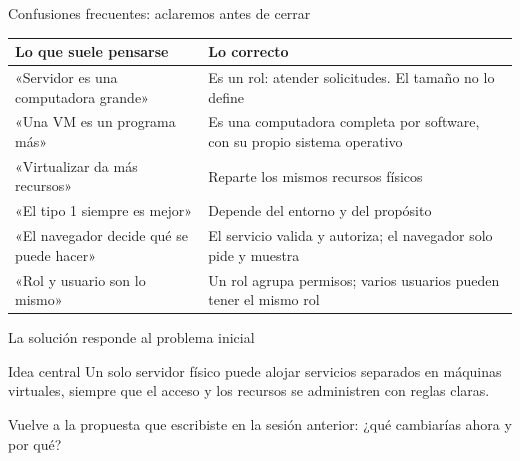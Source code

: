 \documentclass[aspectratio=169,10pt,c]{beamer}
\begin{document}
\begin{frame}{Confusiones frecuentes: aclaremos antes de cerrar\apoyo}
\begin{center}
\small
\begin{tabular}{p{5.1cm}p{5.6cm}}
\toprule
\bfseries Lo que suele pensarse & \bfseries Lo correcto \\
\midrule
«Servidor es una computadora grande» & Es un rol: atender solicitudes. El tamaño no lo define \\
«Una VM es un programa más» & Es una computadora completa por software, con su propio sistema operativo \\
«Virtualizar da más recursos» & Reparte los mismos recursos físicos \\
«El tipo 1 siempre es mejor» & Depende del entorno y del propósito \\
«El navegador decide qué se puede hacer» & El servicio valida y autoriza; el navegador solo pide y muestra \\
«Rol y usuario son lo mismo» & Un rol agrupa permisos; varios usuarios pueden tener el mismo rol \\
\bottomrule
\end{tabular}
\end{center}
\end{frame}

\begin{frame}{La solución responde al problema inicial}
\begin{center}
\end{center}
\vspace{0.1cm}
\begin{block}{Idea central}
Un solo servidor físico puede alojar servicios separados en máquinas virtuales, siempre que el acceso y los recursos se administren con reglas claras.
\end{block}
\vspace{0.05cm}
\small Vuelve a la propuesta que escribiste en la sesión anterior: ¿qué cambiarías ahora y por qué?
\end{frame}
\end{document}
